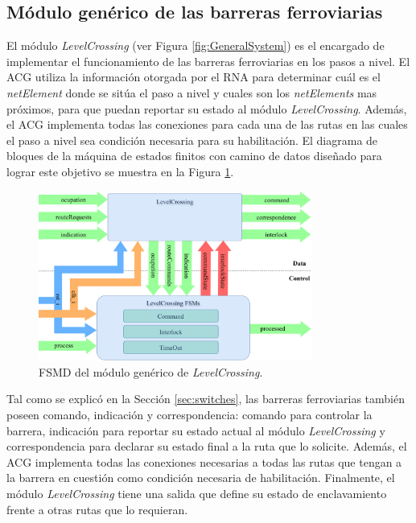 \subsection{Módulo genérico de las barreras ferroviarias}
	\label{sec:ACG_lc}
	
	El módulo \textit{LevelCrossing} (ver Figura \ref{fig:GeneralSystem}) es el encargado de implementar el funcionamiento de las barreras ferroviarias en los pasos a nivel. El ACG utiliza la información otorgada por el RNA para determinar cuál es el \textit{netElement} donde se sitúa el paso a nivel y cuales son los \textit{netElements} mas próximos, para que puedan reportar su estado al módulo \textit{LevelCrossing}. Además, el ACG implementa todas las conexiones para cada una de las rutas en las cuales el paso a nivel sea condición necesaria para su habilitación. El diagrama de bloques de la máquina de estados finitos con camino de datos diseñado para lograr este objetivo se muestra en la Figura \ref{fig:LCB_module}.
	
	\begin{figure}[H]
		\centering
		\includegraphics[width=0.8\textwidth]{Figuras/LCB_module}
		\centering\caption{FSMD del módulo genérico de \textit{LevelCrossing}.}
		\label{fig:LCB_module}
	\end{figure}
	
	Tal como se explicó en la Sección \ref{sec:switches}, las barreras ferroviarias también poseen comando, indicación y correspondencia: comando para controlar la barrera, indicación para reportar su estado actual al módulo \textit{LevelCrossing} y correspondencia para declarar su estado final a la ruta que lo solicite. Además, el ACG implementa todas las conexiones necesarias a todas las rutas que tengan a la barrera en cuestión como condición necesaria de habilitación. Finalmente, el módulo \textit{LevelCrossing} tiene una salida que define su estado de enclavamiento frente a otras rutas que lo requieran.
	
